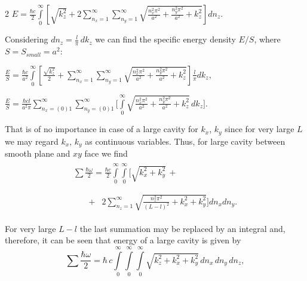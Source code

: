 \documentclass[twoside, 10pt]{article}
\begin{document}
\begin{multicols}{2}
\noindent
\(E = \frac{\hbar c}{2}\int\limits_{0}^{\infty}\left[{\sqrt{k_z^2}+2\sum\limits_{n_x=1}^{\infty}\sum\limits_{n_y=1}^{\infty}\sqrt{\frac{n_x^2\pi^2}{a^2}+\frac{n_y^2\pi^2}{a^2}+k_z^2}}\right]d{n_z}\).

    Considering \(dn_z = \frac{l}{\pi}\,dk_z\) we can find the specific energy density \(E/S\), where
\(S = S_{small} = a^2\):

\noindent
    \(\frac{E}{S} = \frac{\hbar c}{a^2}\int\limits_{0}^{\infty}\left[{\frac{\sqrt{k_z^2}}{2}+\sum\limits_{n_x=1}^{\infty}\sum\limits_{n_y=1}^{\infty}\sqrt{\frac{n_x^2\pi^2}{a^2}+\frac{n_y^2\pi^2}{a^2}+k_z^2}}\right]\frac{l}{\pi}dk_z\),

\noindent
    \(\frac{E}{S} = \frac{\hbar c l}{a^2 \pi} \sum\limits_{n_x=(0)1}^{\infty}
\sum\limits_{n_y=(0)1}^{\infty}\Bigg[\int\limits_{0}^{\infty}\sqrt{\frac{n_x^2\pi^2}{a^2}+\frac{n_y^2\pi^2}{a^2}+k_z^2}\,dk_z\Bigg]\).

    That is of no importance in case of a large cavity for \(k_x\), \(k_y\)
since for very large \(L\) we may regard \(k_x\), \(k_y\) as
continuous variables. Thus, for large cavity between smooth plane and \(xy\) face we find
\noindent
\begin{equation}\begin{array}{l}
\begin{array}{ll}
\sum\frac{\hbar\omega}{2} = \frac{\hbar c}{2}\int\limits_{0}^{\infty}\int\limits_{0}^{\infty}\Bigg[\sqrt{k_x^2+k_y^2}\,+ & \,\\
\end{array} \\
\begin{array}{rr}
\,\,\,\,\,\,\,\,\,\,\,+ & 2\sum\limits_{n_z=1}^{\infty}\sqrt{\frac{n_z^2 \pi^2}{(L-l)^2}+k_x^2+k_y^2}\Bigg]d{n_x}d{n_y}.\end{array}
\end{array}\end{equation}


For very large \(L-l\) the last summation may be replaced by an
integral and, therefore, it can be seen that energy of a large cavity is given by
\noindent
\begin{equation}\sum\frac{\hbar\omega}{2} = \hbar\,c\int\limits_{0}^{\infty}\int\limits_{0}^{\infty}\int\limits_{0}^{\infty}\sqrt{k_z^2+k_x^2+k_y^2}\,d{n_x}\,d{n_y}\,d{n_z},\end{equation}


\end{multicols}
\end{document}
